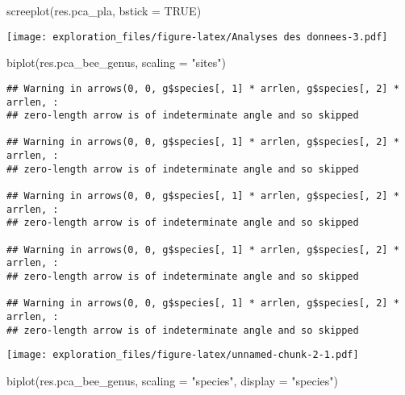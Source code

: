 \documentclass[
]{article}
\newenvironment{Shaded}{\begin{snugshade}}{\end{snugshade}}
\newcommand{\AttributeTok}[1]{\textcolor[rgb]{0.77,0.63,0.00}{#1}}
\newcommand{\ConstantTok}[1]{\textcolor[rgb]{0.00,0.00,0.00}{#1}}
\newcommand{\FunctionTok}[1]{\textcolor[rgb]{0.00,0.00,0.00}{#1}}
\newcommand{\NormalTok}[1]{#1}
\newcommand{\StringTok}[1]{\textcolor[rgb]{0.31,0.60,0.02}{#1}}
\begin{document}
\begin{Shaded}
\begin{Highlighting}[]
\FunctionTok{screeplot}\NormalTok{(res.pca\_pla, }\AttributeTok{bstick =} \ConstantTok{TRUE}\NormalTok{)}
\end{Highlighting}
\end{Shaded}

\texttt{[image: exploration\_files/figure-latex/Analyses des donnees-3.pdf]}

\begin{Shaded}
\begin{Highlighting}[]
\FunctionTok{biplot}\NormalTok{(res.pca\_bee\_genus, }\AttributeTok{scaling =} \StringTok{"sites"}\NormalTok{)}
\end{Highlighting}
\end{Shaded}

\begin{verbatim}
## Warning in arrows(0, 0, g$species[, 1] * arrlen, g$species[, 2] * arrlen, :
## zero-length arrow is of indeterminate angle and so skipped

## Warning in arrows(0, 0, g$species[, 1] * arrlen, g$species[, 2] * arrlen, :
## zero-length arrow is of indeterminate angle and so skipped

## Warning in arrows(0, 0, g$species[, 1] * arrlen, g$species[, 2] * arrlen, :
## zero-length arrow is of indeterminate angle and so skipped

## Warning in arrows(0, 0, g$species[, 1] * arrlen, g$species[, 2] * arrlen, :
## zero-length arrow is of indeterminate angle and so skipped

## Warning in arrows(0, 0, g$species[, 1] * arrlen, g$species[, 2] * arrlen, :
## zero-length arrow is of indeterminate angle and so skipped
\end{verbatim}

\texttt{[image: exploration\_files/figure-latex/unnamed-chunk-2-1.pdf]}

\begin{Shaded}
\begin{Highlighting}[]
\FunctionTok{biplot}\NormalTok{(res.pca\_bee\_genus, }\AttributeTok{scaling =} \StringTok{"species"}\NormalTok{, }\AttributeTok{display =} \StringTok{"species"}\NormalTok{)}
\end{Highlighting}
\end{Shaded}
\end{document}
